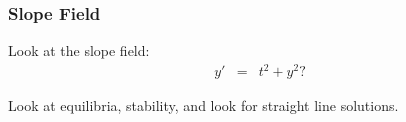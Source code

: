 \begin{frame}
  \frametitle{Slope Field}

  Look at the slope field:
  \begin{eqnarray*}
    y' & = & t^2 + y^2?
  \end{eqnarray*}



  Look at equilibria, stability, and look for straight line solutions.

\end{frame}


